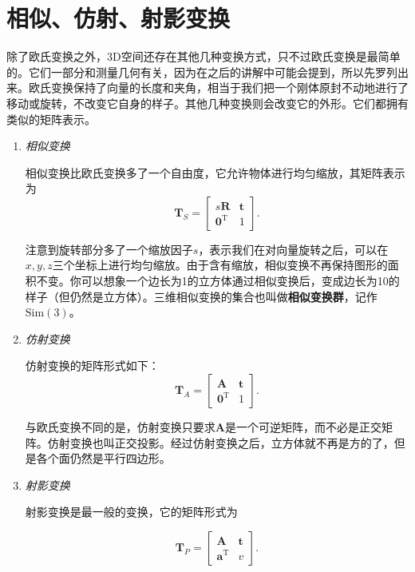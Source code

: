\section{\textsuperscript{\ttfamily *}相似、仿射、射影变换}
除了欧氏变换之外，3D空间还存在其他几种变换方式，只不过欧氏变换是最简单的。它们一部分和测量几何有关，因为在之后的讲解中可能会提到，所以先罗列出来。欧氏变换保持了向量的长度和夹角，相当于我们把一个刚体原封不动地进行了移动或旋转，不改变它自身的样子。其他几种变换则会改变它的外形。它们都拥有类似的矩阵表示。

\begin{enumerate}
	\item {\emph{相似变换}}
	
	相似变换比欧氏变换多了一个自由度，它允许物体进行均匀缩放，其矩阵表示为
	\begin{equation}
	\bm{T}_S = \left[ {\begin{array}{*{20}{c}}
		{s \bm{R}}& \bm{t}\\
		{{ \bm{0}^\mathrm{T}}}&1
		\end{array}} \right].
	\end{equation}
	
	注意到旋转部分多了一个缩放因子$s$，表示我们在对向量旋转之后，可以在$x,y,z$三个坐标上进行均匀缩放。由于含有缩放，相似变换不再保持图形的面积不变。你可以想象一个边长为1的立方体通过相似变换后，变成边长为10的样子（但仍然是立方体）。三维相似变换的集合也叫做\textbf{相似变换群}，记作$\mathrm{Sim}(3)$。
	
	\item { \emph{仿射变换} }
	
	仿射变换的矩阵形式如下：
	\begin{equation}
	\bm{T}_A = \left[ {\begin{array}{*{20}{c}}
		\bm{A} & \bm{t}\\
		{{\bm{0}^\mathrm{T}}} & 1
		\end{array}} \right].
	\end{equation}
	
	与欧氏变换不同的是，仿射变换只要求$\bm{A}$是一个可逆矩阵，而不必是正交矩阵。仿射变换也叫正交投影。经过仿射变换之后，立方体就不再是方的了，但是各个面仍然是平行四边形。
	
	\item{ \emph{射影变换} }
	
	射影变换是最一般的变换，它的矩阵形式为
	
	\begin{equation}
	{\bm{T}_P} = \left[ {\begin{array}{*{20}{c}}
		\bm{A} & \bm{t}\\
		{{\bm{a}^\mathrm{T}}} & v
		\end{array}} \right].
	\end{equation}
	

\end{enumerate}

